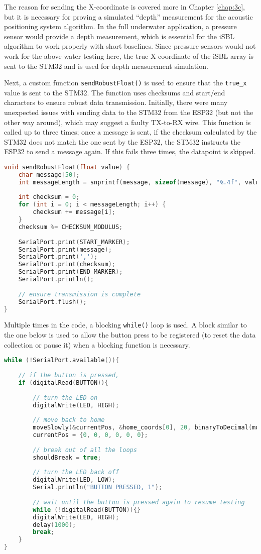 \documentclass[11pt]{ucthesisCP}
\begin{document}
The reason for sending the X-coordinate is covered more in Chapter \ref{chap:3c}, but it is necessary for proving a simulated “depth” measurement for the acoustic positioning system algorithm. In the full underwater application, a pressure sensor would provide a depth measurement, which is essential for the iSBL algorithm to work properly with short baselines. Since pressure sensors would not work for the above-water testing here, the true X-coordinate of the iSBL array is sent to the STM32 and is used for depth measurement simulation.

Next, a custom function \verb|sendRobustFloat()| is used to ensure that the \verb|true_x| value is sent to the STM32. The function uses checksums and start/end characters to ensure robust data transmission. Initially, there were many unexpected issues with sending data to the STM32 from the ESP32 (but not the other way around), which may suggest a faulty TX-to-RX wire. This function is called up to three times; once a message is sent, if the checksum calculated by the STM32 does not match the one sent by the ESP32, the STM32 instructs the ESP32 to send a message again. If this fails three times, the datapoint is skipped.

\begin{lstlisting}[language=C++]
void sendRobustFloat(float value) {
	char message[50];
	int messageLength = snprintf(message, sizeof(message), "%.4f", value);
	
	int checksum = 0;
	for (int i = 0; i < messageLength; i++) {
		checksum += message[i];
	}
	checksum %= CHECKSUM_MODULUS;
	
	SerialPort.print(START_MARKER);
	SerialPort.print(message);
	SerialPort.print(',');
	SerialPort.print(checksum);
	SerialPort.print(END_MARKER);
	SerialPort.println();
	
	// ensure transmission is complete
	SerialPort.flush();
}
\end{lstlisting}

Multiple times in the code, a blocking \verb|while()| loop is used. A block similar to the one below is used to allow the button press to be registered (to reset the data collection or pause it) when a blocking function is necessary.

\begin{lstlisting}[language=C++]
while (!SerialPort.available()){
	
	// if the button is pressed,
	if (digitalRead(BUTTON)){
		
		// turn the LED on
		digitalWrite(LED, HIGH);
		
		// move back to home
		moveSlowly(&currentPos, &home_coords[0], 20, binaryToDecimal(move_str));
		currentPos = {0, 0, 0, 0, 0, 0};
		
		// break out of all the loops
		shouldBreak = true;
		
		// turn the LED back off
		digitalWrite(LED, LOW);
		Serial.println("BUTTON PRESSED, 1");
		
		// wait until the button is pressed again to resume testing
		while (!digitalRead(BUTTON)){}
		digitalWrite(LED, HIGH);
		delay(1000);
		break;
	}
}
\end{lstlisting}
\end{document}
